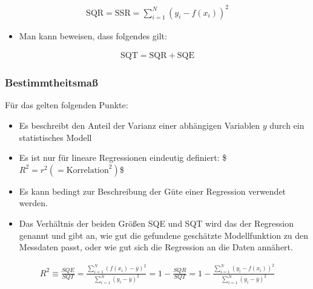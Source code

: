 \documentclass[letterpaper,10pt,english]{jupyterBook}
\begin{document}
\begin{equation*}
\begin{split}\mathrm{SQR} = \mathrm{SSR} = \sum_{i=1}^N(y_i-f(x_i))^2\end{split}
\end{equation*}\begin{itemize}
\item {} 
\sphinxAtStartPar
Man kann beweisen, dass folgendes gilt:

\end{itemize}
\begin{equation*}
\begin{split}\mathrm{SQT} = \mathrm{SQR} + \mathrm{SQE}\end{split}
\end{equation*}

\subsubsection{Bestimmtheitsmaß }
\label{\detokenize{content/1_Kurvenanpassung:bestimmtheitsmasz-a-id-subsec-bestimmtheitsmasz-a}}
\sphinxAtStartPar
Für das  gelten folgenden Punkte:
\begin{itemize}
\item {} 
\sphinxAtStartPar
Es beschreibt den Anteil der Varianz einer abhängigen Variablen \(y\) durch ein statistisches Modell

\item {} 
\sphinxAtStartPar
Es ist nur für lineare Regressionen eindeutig definiert:
\$\(\mathit{R}^2 = r^2 (=\textrm{Korrelation}^2)\)\$

\item {} 
\sphinxAtStartPar
Es kann bedingt zur Beschreibung der Güte einer Regression verwendet werden.

\item {} 
\sphinxAtStartPar
Das Verhältnis der beiden Größen SQE und SQT wird das  der Regression genannt und gibt an, wie gut die gefundene geschätzte Modellfunktion zu den Messdaten passt, oder wie gut sich die Regression an die Daten annähert.

\end{itemize}
\begin{equation*}
\begin{split}\mathit{R}^2 \equiv \frac{SQE}{SQT}=
\frac{\displaystyle\sum_{i=1}^N \left(f(x_i)- \overline{y}\right)^2}{\displaystyle\sum_{i=1}^N \left(y_i - \overline{y}\right)^2} = 1 - \frac{SQR}{SQT}=1-\frac{\displaystyle\sum_{i=1}^N \left(y_i - f(x_i)\right)^2}{\displaystyle\sum_{i=1}^N \left(y_i - \overline{y}\right)^2}\end{split}
\end{equation*}
\end{document}

